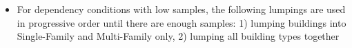 \begin{itemize}
\item For dependency conditions with low samples, the following lumpings are used in progressive order until there are enough samples: 1) lumping buildings into Single-Family and Multi-Family only, 2) lumping all building types together
\end{itemize}
